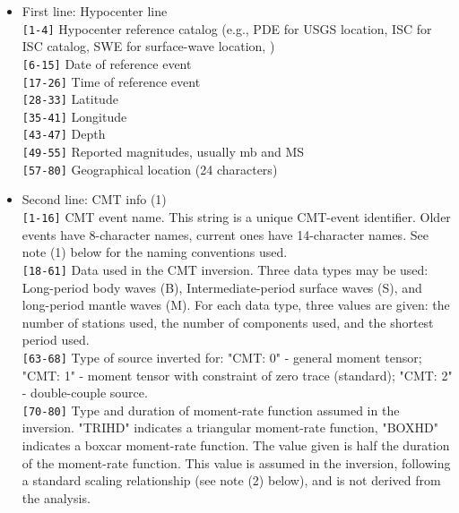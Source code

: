 \begin{itemize}
\item First line: Hypocenter line\\
\verb|[1-4]|   Hypocenter reference catalog (e.g., PDE for USGS location, ISC for
               ISC catalog, SWE for surface-wave location, \textcite{ekst06})\\
\verb|[6-15]|  Date of reference event\\
\verb|[17-26]| Time of reference event\\
\verb|[28-33]| Latitude\\
\verb|[35-41]| Longitude\\
\verb|[43-47]| Depth\\
\verb|[49-55]| Reported magnitudes, usually mb and MS\\
\verb|[57-80]| Geographical location (24 characters)

\item Second line: CMT info (1)\\
\verb|[1-16]|  CMT event name. This string is a unique CMT-event identifier. Older
        events have 8-character names, current ones have 14-character names.
        See note (1) below for the naming conventions used.\\
\verb|[18-61]| Data used in the CMT inversion. Three data types may be used: 
        Long-period body waves (B), Intermediate-period surface waves (S),
        and long-period mantle waves (M). For each data type, three values
        are given: the number of stations used, the number of components 
        used, and the shortest period used.\\
\verb|[63-68]| Type of source inverted for: "CMT: 0" - general moment tensor; 
        "CMT: 1" - moment tensor with constraint of zero trace (standard); 
        "CMT: 2" - double-couple source.\\
\verb|[70-80]| Type and duration of moment-rate function assumed in the inversion. 
        "TRIHD" indicates a triangular moment-rate function, "BOXHD" indicates
        a boxcar moment-rate function. The value given is half the duration
        of the moment-rate function. This value is assumed in the inversion,
        following a standard scaling relationship (see note (2) below),
        and is not derived from the analysis.
        

\end{itemize}
